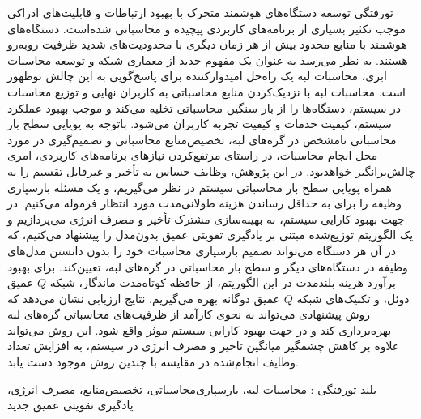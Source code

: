 


\pagestyle{empty}

‌تورفتگی
توسعه دستگاه‌های هوشمند متحرک با بهبود ارتباطات و قابلیت‌های ادراکی موجب تکثیر بسیاری از برنامه‌های کاربردی پیچیده و محاسباتی شده‌است. دستگاه‌های هوشمند با منابع محدود بیش از هر زمان دیگری با محدودیت‌های شدید ظرفیت روبه‌رو هستند. به نظر می‌رسد به عنوان یک مفهوم جدید از معماری شبکه و توسعه محاسبات ابری، محاسبات لبه یک راه‌حل امیدوارکننده برای پاسخ‌گویی به این چالش نوظهور است. محاسبات لبه با نزدیک‌کردن منابع محاسباتی به کاربران نهایی و توزیع محاسبات در سیستم، دستگاه‌ها را از بار سنگین محاسباتی تخلیه می‌کند و موجب بهبود عملکرد سیستم، کیفیت خدمات و کیفیت تجربه کاربران می‌شود. باتوجه به پویایی سطح بار محاسباتی نامشخص در گره‌های لبه، تخصیص‌منابع محاسباتی و تصمیم‌گیری در مورد محل انجام محاسبات، در راستای مرتفع‌کردن نیازهای برنامه‌های کاربردی، امری چالش‌برانگیز خواهدبود. در این پژوهش، وظایف حساس به تأخیر و غیرقابل تقسیم را به همراه پویایی سطح بار محاسباتی سیستم در نظر می‌گیریم، و یک مسئله بارسپاری وظیفه را برای به حداقل رساندن هزینه طولانی‌مدت مورد انتظار فرموله می‌کنیم. در جهت بهبود کارایی سیستم، به بهینه‌سازی مشترک تأخیر و مصرف انرژی می‌پردازیم و یک الگوریتم توزیع‌شده مبتنی بر یادگیری تقویتی عمیق بدون‌مدل را پیشنهاد می‌کنیم، که در آن هر دستگاه می‌تواند تصمیم بارسپاری محاسبات خود را بدون دانستن مدل‌های وظیفه در دستگاه‌های دیگر و سطح بار محاسباتی در گره‌های لبه، تعیین‌کند. برای بهبود برآورد هزینه بلندمدت در  این الگوریتم، از حافظه کوتاه‌مدت ماندگار، شبکه $Q$ عمیق دوئل، و تکنیک‌های شبکه $Q$ عمیق دوگانه بهره می‌گیریم. نتایج ارزیابی نشان می‌دهد که روش پیشنهادی می‌تواند به نحوی کارآمد از ظرفیت‌های محاسباتی گره‌های لبه بهره‌برداری کند و در جهت بهبود کارایی سیستم موثر واقع شود. این روش می‌تواند علاوه بر کاهش چشمگیر میانگین تاخیر و مصرف انرژی در سیستم، به افزایش تعداد وظایف انجام‌شده در مقایسه با چندین روش موجود دست یابد.  


‌بلند
‌تورفتگی : 
محاسبات لبه، بارسپاری‌محاسباتی، تخصیص‌منابع، مصرف انرژی، یادگیری ‌تقویتی عمیق 
‌جدید
